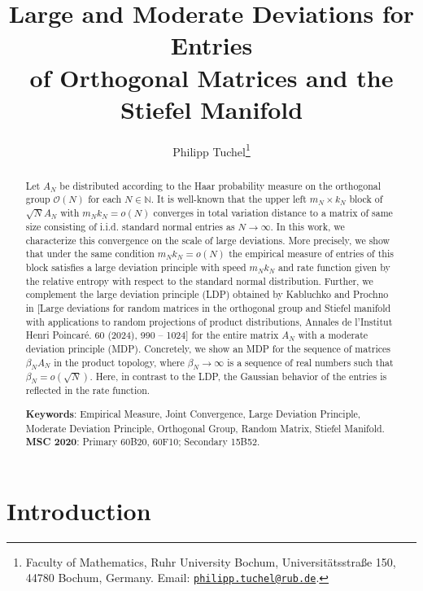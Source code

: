\documentclass[11pt,a4paper,twoside]{article}
\newcommand{\N}{\mathbb N}
\renewcommand{\O}{\mathcal O}
\theoremstyle{definition}
\begin{document}
\title{\textbf{Large and Moderate Deviations for Entries\\
of Orthogonal Matrices and the Stiefel Manifold}}
\author{Philipp Tuchel\thanks{Faculty of Mathematics, Ruhr University Bochum, Universit\"atsstra\ss e 150, 44780 Bochum, Germany. Email: \href{mailto:philipp.tuchel@rub.de}{\nolinkurl{philipp.tuchel@rub.de}}.}}
\date{}
\maketitle

\begin{abstract}
\small
Let $A_N$ be distributed according to the Haar probability measure on the orthogonal group $\O(N)$ for each $N\in\N$. It is well-known that the upper left $m_N\times k_N$ block of $\sqrt{N}A_N$ with $m_Nk_N = o(N)$ converges in total variation distance to a matrix of same size consisting of i.i.d. standard normal entries as $N\to\infty$. In this work, we characterize this convergence on the scale of large deviations. More precisely, we show that under the same condition $m_Nk_N = o(N)$ the empirical measure of entries of this block satisfies a large deviation principle with speed $m_Nk_N$ and rate function given by the relative entropy with respect to the standard normal distribution. Further, we complement the large deviation principle (LDP) obtained by Kabluchko and Prochno in [Large deviations for random matrices in the orthogonal group and Stiefel manifold with applications to random projections of product distributions, Annales de l'Institut Henri Poincar\'e. 60 (2024), 990 -- 1024] for the entire matrix $A_N$ with a moderate deviation principle (MDP). Concretely, we show an MDP for the sequence of matrices $\beta_N A_N$ in the product topology, where $\beta_N\to\infty$ is a sequence of real numbers such that $\beta_N = o(\sqrt{N})$. Here, in contrast to the LDP, the Gaussian behavior of the entries is reflected in the rate function.

\medspace
\vskip 1mm
\noindent\textbf{Keywords}: Empirical Measure, Joint Convergence, Large Deviation Principle, Moderate Deviation Principle, Orthogonal Group, Random Matrix, Stiefel Manifold.\\
\textbf{MSC 2020}: Primary 60B20, 60F10; Secondary 15B52.
\end{abstract}

\section{Introduction}
\label{C:sec:introduction}
\end{document}
